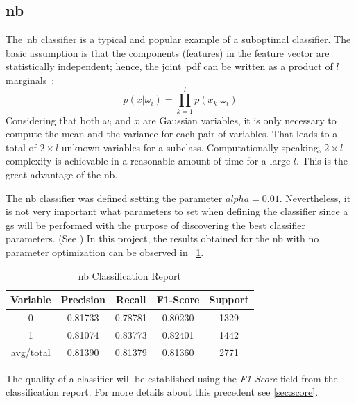 \subsection{\acf{nb}}
The~\ac{nb} classifier is a typical and popular example of a suboptimal classifier. The basic assumption is that the components (features) in the feature vector are statistically independent; hence, the joint~\ac{pdf} can be written as a product of $l$ marginals~\cite{classif}:
\begin{equation}
	p(x|\omega_i)=\prod_{k=1}^{l}p(x_k|\omega_i)
	\label{ec:nb}
\end{equation}
Considering that both $\omega_i$ and $x$ are Gaussian variables, it is only necessary to compute the mean and the variance for each pair of variables. That leads to a total of $2\times l$ unknown variables for a subclass. Computationally speaking, $2\times l$ complexity is achievable in a reasonable amount of time for a large $l$. This is the great advantage of the \ac{nb}.\par
The \ac{nb} classifier was defined setting the parameter $alpha = 0.01$. Nevertheless, it is not very important what parameters to set when defining the classifier since a \ac{gs} will be performed with the purpose of discovering the best classifier parameters. (See )
In this project, the results obtained for the \ac{nb} with no parameter optimization can be observed in ~\cref{tab:nb1}.
\begin{table}[h!]
	\centering
	\begin{tabular}{||c c c c c||} 
		\hline
		Variable & Precision & Recall & F1-Score & Support \\ [0.5ex] 
		\hline\hline
		0 & 0.81733 & 0.78781 & 0.80230 & 1329 \\ 
		1 & 0.81074 & 0.83773 & 0.82401 & 1442 \\
		avg/total & 0.81390 & 0.81379 & 0.81360 & 2771 \\
		[1ex] 
		\hline
	\end{tabular}
		\caption{\acl{nb} Classification Report}
		\label{tab:nb1}
\end{table}
The quality of a classifier will be established using the \textit{F1-Score} field from the classification report. For more details about this precedent see \cref{sec:score}.
